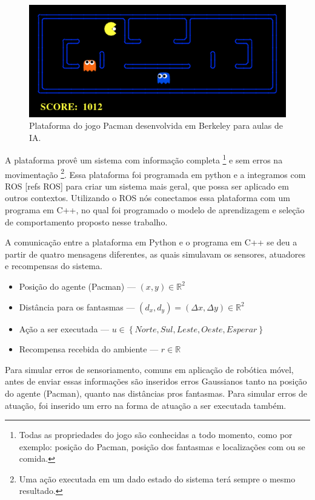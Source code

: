 \begin{figure}[H]
    \centering
    \includegraphics[width=120mm]{images/pacman_platform}
    \caption{\label{img:PlataformaSimulacaoPacman}Plataforma do jogo Pacman desenvolvida em Berkeley para aulas de IA.}
\end{figure}

A plataforma provê um sistema com informação completa%
\footnote{Todas as propriedades do jogo são conhecidas a todo momento, como por exemplo: posição do Pacman, posição dos fantasmas e localizações com ou se comida.%
} e sem erros na movimentação%
\footnote{Uma ação executada em um dado estado do sistema terá sempre o mesmo resultado.%
}. Essa plataforma foi programada em python e a integramos com ROS [refs ROS] para criar um sistema mais geral, que possa ser aplicado em outros contextos. Utilizando o ROS nós conectamos essa plataforma com um programa em C++, no qual foi programado o modelo de aprendizagem e seleção de comportamento proposto nesse trabalho.

A comunicação entre a plataforma em Python e o programa em C++ se deu a partir de quatro mensagens diferentes, as quais simulavam os sensores, atuadores e recompensas do sistema.

\begin{itemize}
	\item Posição do agente (Pacman) --- $ \left( x, y \right) \in \mathbb{R}^2 $
	\item Distância para os fantasmas --- $ \left( d_x, d_y \right) = \left( \Delta x, \Delta y \right) \in \mathbb{R}^2 $
	\item Ação a ser executada --- $ u \in \left\{Norte, Sul, Leste, Oeste, Esperar \right\} $
	\item Recompensa recebida do ambiente --- $ r \in \mathbb{R} $
\end{itemize}

Para simular erros de sensoriamento, comuns em aplicação de robótica móvel, antes de enviar essas informações são inseridos erros Gaussianos tanto na posição do agente (Pacman), quanto nas distâncias pros fantasmas. Para simular erros de atuação, foi inserido um erro na forma de atuação a ser executada também.


